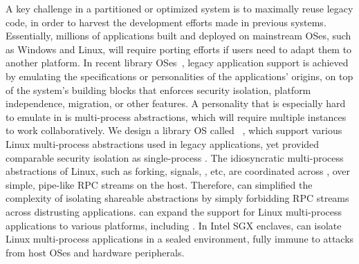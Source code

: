 A key challenge in a partitioned or optimized system is
to maximally reuse legacy code, %
in order to harvest the development efforts made in previous systems.
Essentially, millions of applications built and deployed
on mainstream OSes,
such as Windows and Linux,
will require porting efforts if users need to adapt them to another platform. 
In recent library OSes~\citep{porter11drawbridge, baumann13bascule, tsai14graphene, baumann14haven},
legacy application support is achieved
by emulating
the specifications or personalities of the applications' origins,
on top of the system's building blocks
that enforces security isolation, platform independence, migration, or other features.
A personality that is especially hard to emulate in \picoprocs{}
is multi-process abstractions,
which will require multiple \libos{} instances to work collaboratively. 
We design a library OS called \term{\graphene{}}~\citep{tsai14graphene},
which support various Linux multi-process abstractions used in legacy applications,
yet provided comparable security isolation
as single-process \picoprocs{}.
The idiosyncratic multi-process abstractions of Linux, such as forking, signals, \sysvipc{}, etc,
are coordinated across \picoprocs{},
over simple, pipe-like RPC streams on the host.
Therefore, \graphene{} can simplified the complexity of isolating shareable abstractions
by simply forbidding RPC streams across distrusting applications.
\graphene{} can expand the support for Linux multi-process applications
to various platforms, including .
In Intel SGX enclaves, \graphene{} can isolate Linux multi-process applications
in a sealed environment,
fully immune to 
attacks from host OSes and hardware peripherals.

